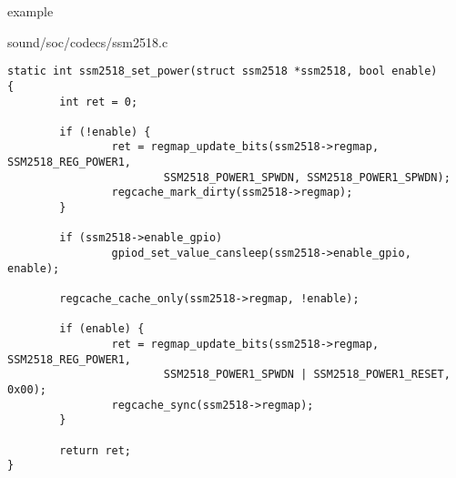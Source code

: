\begin{frame}[fragile]{ example}
  \begin{block}{sound/soc/codecs/ssm2518.c}
    \fontsize{8}{8}\selectfont
    \begin{verbatim}
static int ssm2518_set_power(struct ssm2518 *ssm2518, bool enable)
{
        int ret = 0;

        if (!enable) {
                ret = regmap_update_bits(ssm2518->regmap, SSM2518_REG_POWER1,
                        SSM2518_POWER1_SPWDN, SSM2518_POWER1_SPWDN);
                regcache_mark_dirty(ssm2518->regmap);
        }

        if (ssm2518->enable_gpio)
                gpiod_set_value_cansleep(ssm2518->enable_gpio, enable);

        regcache_cache_only(ssm2518->regmap, !enable);

        if (enable) {
                ret = regmap_update_bits(ssm2518->regmap, SSM2518_REG_POWER1,
                        SSM2518_POWER1_SPWDN | SSM2518_POWER1_RESET, 0x00);
                regcache_sync(ssm2518->regmap);
        }

        return ret;
}
    \end{verbatim}
  \end{block}
\end{frame}
